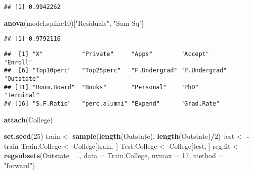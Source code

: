\documentclass[
]{article}
\newenvironment{Shaded}{\begin{snugshade}}{\end{snugshade}}
\newcommand{\CommentTok}[1]{\textcolor[rgb]{0.56,0.35,0.01}{\textit{#1}}}
\newcommand{\DataTypeTok}[1]{\textcolor[rgb]{0.13,0.29,0.53}{#1}}
\newcommand{\DecValTok}[1]{\textcolor[rgb]{0.00,0.00,0.81}{#1}}
\newcommand{\KeywordTok}[1]{\textcolor[rgb]{0.13,0.29,0.53}{\textbf{#1}}}
\newcommand{\NormalTok}[1]{#1}
\newcommand{\OperatorTok}[1]{\textcolor[rgb]{0.81,0.36,0.00}{\textbf{#1}}}
\newcommand{\StringTok}[1]{\textcolor[rgb]{0.31,0.60,0.02}{#1}}
\begin{document}
\begin{verbatim}
## [1] 0.9942262
\end{verbatim}

\begin{Shaded}
\begin{Highlighting}[]
\KeywordTok{anova}\NormalTok{(model.spline10)[}\StringTok{"Residuals"}\NormalTok{, }\StringTok{"Sum Sq"}\NormalTok{]}
\end{Highlighting}
\end{Shaded}

\begin{verbatim}
## [1] 0.9792116
\end{verbatim}

\begin{Shaded}
\end{Shaded}

\begin{verbatim}
##  [1] "X"           "Private"     "Apps"        "Accept"      "Enroll"     
##  [6] "Top10perc"   "Top25perc"   "F.Undergrad" "P.Undergrad" "Outstate"   
## [11] "Room.Board"  "Books"       "Personal"    "PhD"         "Terminal"   
## [16] "S.F.Ratio"   "perc.alumni" "Expend"      "Grad.Rate"
\end{verbatim}

\begin{Shaded}
\begin{Highlighting}[]
\KeywordTok{attach}\NormalTok{(College)}

\KeywordTok{set.seed}\NormalTok{(}\DecValTok{25}\NormalTok{)}
\NormalTok{train <-}\StringTok{ }\KeywordTok{sample}\NormalTok{(}\KeywordTok{length}\NormalTok{(Outstate), }\KeywordTok{length}\NormalTok{(Outstate)}\OperatorTok{/}\DecValTok{2}\NormalTok{)}
\NormalTok{test <-}\StringTok{ }\OperatorTok{-}\NormalTok{train}
\NormalTok{Train.College <-}\StringTok{ }\NormalTok{College[train, ]}
\NormalTok{Test.College <-}\StringTok{ }\NormalTok{College[test, ]}
\NormalTok{reg.fit <-}\StringTok{ }\KeywordTok{regsubsets}\NormalTok{(Outstate }\OperatorTok{~}\StringTok{ }\NormalTok{., }\DataTypeTok{data =}\NormalTok{ Train.College, }\DataTypeTok{nvmax =} \DecValTok{17}\NormalTok{, }\DataTypeTok{method =} \StringTok{"forward"}\NormalTok{)}
\end{Highlighting}
\end{Shaded}
\end{document}
